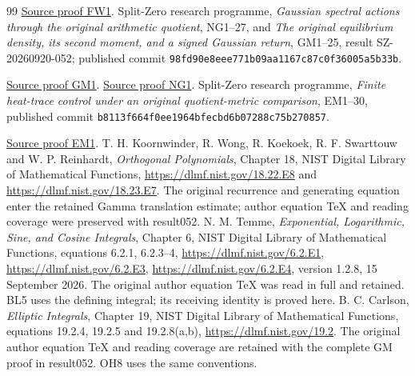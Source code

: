 \documentclass[11pt]{article}
\begin{document}
\begin{thebibliography}{99}
\href{https://github.com/KokunoYumeto/zeta-function-research-reader/blob/5992ad50c0f2a06921f1fcaded7b4e38097c0739/workbenches/splitzero-tandem/continuations/20260920-original-kernel-mixed-determinants/providers/FULL_WINDOW_SOURCE_PRODUCTS.tex\#L28}{Source proof FW1}.
 Split-Zero research programme, \emph{Gaussian spectral
actions through the original arithmetic quotient}, NG1--27, and
\emph{The original equilibrium density, its second moment, and a signed
Gaussian return}, GM1--25, result SZ-20260920-052; published commit
\nolinkurl{98fd90e8eee771b09aa1167c87c0f36005a5b33b}.

\href{https://github.com/KokunoYumeto/zeta-function-research-reader/blob/5992ad50c0f2a06921f1fcaded7b4e38097c0739/workbenches/splitzero-tandem/continuations/20260920-original-kernel-mixed-determinants/providers/GAUSSIAN_EQUILIBRIUM_MOMENTS.tex\#L22}{Source proof GM1}. \href{https://github.com/KokunoYumeto/zeta-function-research-reader/blob/5992ad50c0f2a06921f1fcaded7b4e38097c0739/workbenches/splitzero-tandem/continuations/20260920-original-kernel-mixed-determinants/providers/GAUSSIAN_ARITHMETIC_RETURN.tex\#L31}{Source proof NG1}.
 Split-Zero research programme, \emph{Finite heat-trace
control under an original quotient-metric comparison}, EM1--30,
published commit \nolinkurl{b8113f664f0ee1964bfecbd6b07288c75b270857}.

\href{https://github.com/KokunoYumeto/zeta-function-research-reader/blob/5992ad50c0f2a06921f1fcaded7b4e38097c0739/workbenches/splitzero-tandem/continuations/20260920-original-kernel-mixed-determinants/providers/ENDPOINT_METRIC_HEAT.tex\#L38}{Source proof EM1}.
 T. H. Koornwinder, R. Wong, R. Koekoek,
R. F. Swarttouw and W. P. Reinhardt, \emph{Orthogonal Polynomials},
Chapter 18, NIST Digital Library of Mathematical Functions,
\url{https://dlmf.nist.gov/18.22.E8} and
\url{https://dlmf.nist.gov/18.23.E7}. The original recurrence and
generating equation enter the retained Gamma translation estimate;
author equation TeX and reading coverage were preserved with result052.
 N. M. Temme, \emph{Exponential, Logarithmic, Sine, and
Cosine Integrals}, Chapter 6, NIST Digital Library of Mathematical
Functions, equations 6.2.1, 6.2.3--4,
\url{https://dlmf.nist.gov/6.2.E1},
\url{https://dlmf.nist.gov/6.2.E3},
\url{https://dlmf.nist.gov/6.2.E4}, version 1.2.8, 15 September 2026.
The original author equation TeX was read in full and retained. BL5
uses the defining integral; its receiving identity is proved here.
 B. C. Carlson, \emph{Elliptic Integrals}, Chapter 19,
NIST Digital Library of Mathematical Functions, equations 19.2.4,
19.2.5 and 19.2.8(a,b), \url{https://dlmf.nist.gov/19.2}.
The original author equation TeX and reading coverage are retained
with the complete GM proof in result052. OH8 uses the same conventions.



\end{thebibliography}
\end{document}
